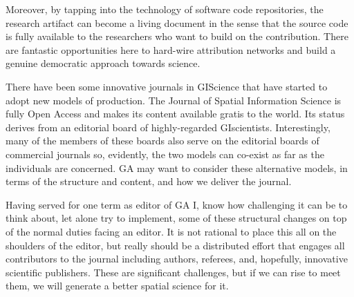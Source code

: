 \documentclass[11pt]{article}
\begin{document}
Moreover, by tapping into the technology of software code repositories, the
research artifact can become a living document in the sense that the source code
is fully available to the researchers who want to build on the contribution.
There are fantastic opportunities here to hard-wire attribution networks and
build a genuine democratic approach towards science.

There have been some innovative journals in GIScience that have started to adopt
new models of production. The Journal of Spatial Information Science is fully
Open Access and makes its content available gratis to the world. Its status
derives from an editorial board of highly-regarded GIscientists. Interestingly,
many of the members of these boards also serve on the editorial boards of
commercial journals so, evidently, the two models can co-exist as far as the
individuals are concerned. GA may want to consider these alternative models, in
terms of the structure and content, and how we deliver the journal.

Having served for one term as editor of GA I, know how challenging it can be to
think about, let alone try to implement, some of these structural changes on top
of the normal duties facing an editor. It is not rational to place this all on
the shoulders of the editor, but really should be a distributed effort that
engages all contributors to the journal including authors, referees, and,
hopefully, innovative scientific publishers. These are significant challenges,
but if we can rise to meet them, we will generate a better spatial science for
it.



\end{document}
